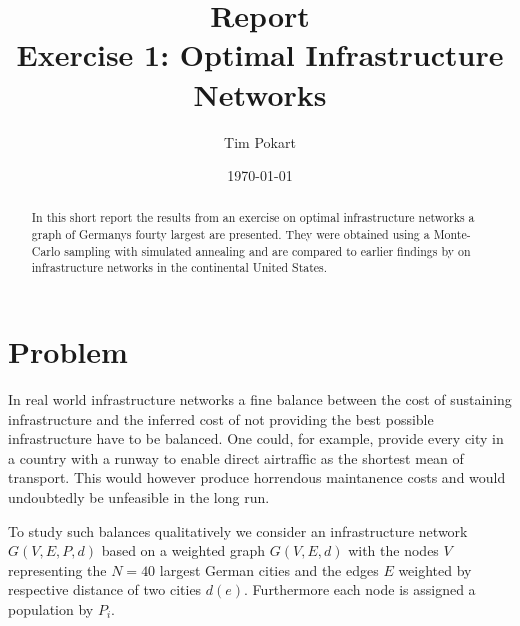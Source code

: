 \documentclass[aps,pra,showpacs,preprintnumbers,amsmath,amssymb,footinbib]{revtex4-2}
\begin{document}
    \title{Report\\Exercise 1: Optimal Infrastructure Networks}
    \author{Tim Pokart}
    \date{\today}
    
    \begin{abstract}
        In this short report the results from an exercise on optimal infrastructure networks a graph of Germanys fourty largest are presented.
        They were obtained using a Monte-Carlo sampling with simulated annealing and are compared to earlier findings by \citeauthor{PhysRevE.74.016117} \cite{PhysRevE.74.016117} on infrastructure networks in the continental United States.
    \end{abstract}
        
    \maketitle

    \tableofcontents

    \section{Problem}

    In real world infrastructure networks a fine balance between the cost of sustaining infrastructure and the inferred cost of not providing the best possible infrastructure have to be balanced.
    One could, for example, provide every city in a country with a runway to enable direct airtraffic as the shortest mean of transport. 
    This would however produce horrendous maintanence costs and would undoubtedly be unfeasible in the long run.
    
    To study such balances qualitatively we consider an infrastructure network $G(V, E, P, d)$ based on a weighted graph $G(V, E, d)$ with the nodes $V$ representing the $N = 40$ largest German cities and the edges $E$ weighted by respective distance of two cities $d(e)$.    
    Furthermore each node is assigned a population by $P_i$. 
\end{document}
